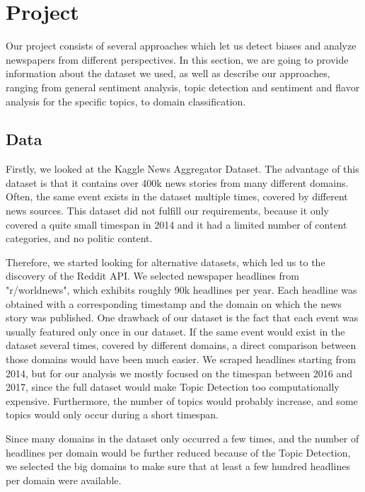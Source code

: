 \documentclass[final]{ieee}
\begin{document}
\section{Project}\label{sec:project}

Our project consists of several approaches which let us detect biases and analyze newspapers from different perspectives. In this section, we are going to provide information about the dataset we used, as well as describe our approaches, ranging from general sentiment analysis, topic detection and sentiment and flavor analysis for the specific topics, to domain classification.

\subsection{Data}

Firstly, we looked at the Kaggle News Aggregator Dataset\cite{Lichman13}. The advantage of this dataset is that it contains over 400k news stories from many different domains. Often, the same event exists in the dataset multiple times, covered by different news sources.
This dataset did not fulfill our requirements, because it only covered a quite small timespan in 2014 and it had a limited number of content categories, and no politic content.

Therefore, we started looking for alternative datasets, which led us to the discovery of the Reddit API. We selected newspaper headlines from "r/worldnews", which exhibits roughly 90k headlines per year. Each headline was obtained with a corresponding timestamp and the domain on which the news story was published. One drawback of our dataset is the fact that each event was usually featured only once in our dataset. If the same event would exist in the dataset several times, covered by different domains, a direct comparison between those domains would have been much easier. We scraped headlines starting from 2014, but for our analysis we mostly focused on the timespan between 2016 and 2017, since the full dataset would make Topic Detection too computationally expensive. Furthermore, the number of topics would probably increase, and some topics would only occur during a short timespan.

Since many domains in the dataset only occurred a few times, and the number of headlines per domain would be further reduced because of the Topic Detection, we selected the big domains to make sure that at least a few hundred headlines per domain were available.
\end{document}
